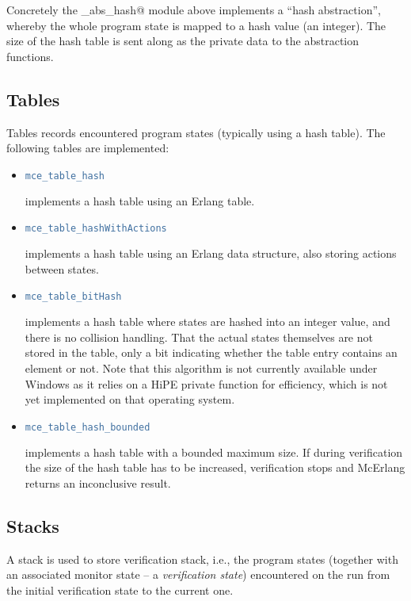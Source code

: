 \documentclass[a4paper]{article}
\begin{document}
Concretely the \lstinline@mce_abs_hash@ module above implements
a ``hash abstraction'', whereby the whole program state is mapped
to a hash value (an integer). The size of the hash table
is sent along as the private data to the abstraction functions.

\subsection{Tables}
\label{tables}

Tables records encountered
program states (typically using a hash table).
The following tables are implemented:
\begin{itemize}
\item
\begin{lstlisting}[language=Erlang]
mce_table_hash
\end{lstlisting}
implements a hash table using an Erlang \lstinline@ets@ table.

\item
\begin{lstlisting}[language=Erlang]
mce_table_hashWithActions
\end{lstlisting}
implements a hash table using an Erlang \lstinline@dict@ data
structure, also storing actions between states.

\item
\begin{lstlisting}[language=Erlang]
mce_table_bitHash
\end{lstlisting}
implements a hash table where states are hashed into
an integer value, and there is no collision handling.
That the actual states themselves are not stored in
the table, only a bit indicating whether the table
entry contains an element or not.
Note that this algorithm is not currently
available under Windows as it relies on a HiPE private function
for efficiency,
which is not yet implemented on that operating system.

\item
\begin{lstlisting}[language=Erlang]
mce_table_hash_bounded
\end{lstlisting}
implements a hash table with a bounded maximum 
size. If during verification
the size of the hash table has to be increased, 
verification stops and McErlang returns an inconclusive result.
\end{itemize}

\subsection{Stacks}
\label{stacks}
A stack is used to store verification stack, i.e., the program
states (together with an associated monitor state -- 
a {\em verification state}) encountered
on the run from the initial verification state to the current one.
\end{document}
